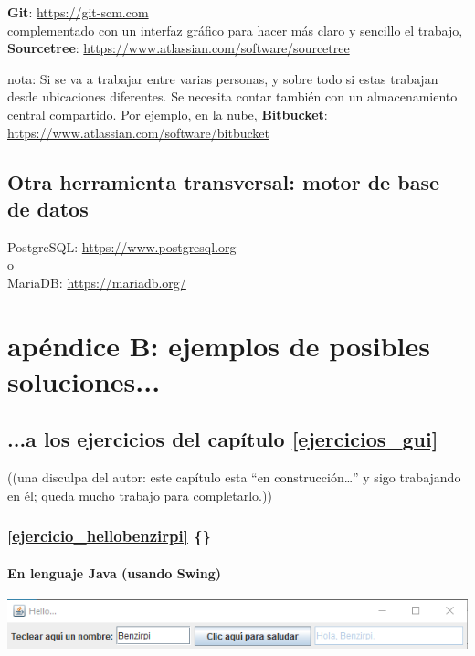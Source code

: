 \documentclass[spanish,12pt,a4paper,final,oneside]{book}
\begin{document}
\textbf{Git}: \url{https://git-scm.com}
\\complementado con un interfaz gráfico para hacer más claro y sencillo el trabajo, 
\textbf{Sourcetree}: \url{https://www.atlassian.com/software/sourcetree} 

nota: Si se va a trabajar entre varias personas, y sobre todo si estas trabajan desde ubicaciones diferentes. Se necesita contar también con un almacenamiento central compartido. Por ejemplo, en la nube, \textbf{Bitbucket}: \url{https://www.atlassian.com/software/bitbucket} 

\section{Otra herramienta transversal: motor de base de datos}
PostgreSQL: \url{https://www.postgresql.org}
\\o\\
MariaDB: \url{https://mariadb.org/}


\chapter{apéndice B: ejemplos de posibles soluciones...}\label{ejercicios_posibles_soluciones}


\section{...a los ejercicios del capítulo \ref{ejercicios_gui}}

\begin{footnotesize}((una disculpa del autor: este capítulo esta ``en construcción\ldots'' y sigo trabajando en él; queda mucho trabajo para completarlo.))\end{footnotesize}

\vspace{2cm}
\subsection*{\ref{ejercicio_hellobenzirpi} \{\}}
\vspace{0.5cm}
\subsubsection*{En lenguaje Java (usando Swing)} \lstset{language=Java} 
\includegraphics[width=\textwidth]{HelloBenzirpi - pantallazo - Java}



\vspace{1cm}
\end{document}
